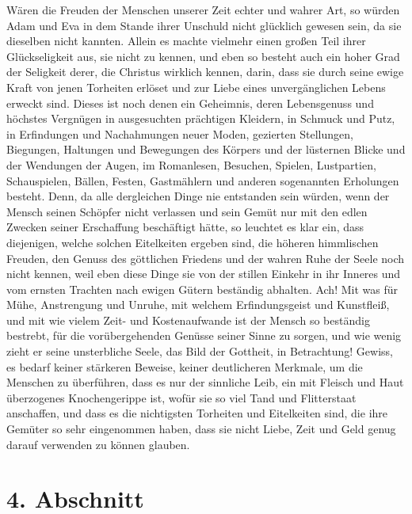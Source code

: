 Wären die Freuden der Menschen unserer Zeit echter und wahrer Art, so würden
Adam und Eva in dem Stande ihrer
Unschuld nicht glücklich gewesen sein, da sie
dieselben nicht kannten. Allein es machte vielmehr einen großen Teil ihrer
Glückseligkeit aus, sie nicht zu kennen, und eben so besteht auch ein hoher
Grad der Seligkeit derer, die Christus wirklich kennen, darin, dass sie durch
seine ewige Kraft von jenen Torheiten erlöset und zur Liebe eines
unvergänglichen Lebens erweckt sind. Dieses ist noch denen ein Geheimnis, deren
Lebensgenuss und höchstes Vergnügen in ausgesuchten prächtigen Kleidern, in
Schmuck und Putz, in Erfindungen und
Nachahmungen neuer Moden, gezierten
Stellungen, Biegungen, Haltungen und Bewegungen des Körpers und der lüsternen
Blicke und der Wendungen der Augen, im Romanlesen, Besuchen,
Spielen,
Lustpartien, Schauspielen, Bällen,
Festen, Gastmählern und anderen sogenannten
Erholungen besteht. Denn, da alle dergleichen Dinge nie entstanden sein würden,
wenn der Mensch seinen Schöpfer nicht verlassen und sein Gemüt nur mit den
edlen Zwecken seiner Erschaffung beschäftigt hätte, so leuchtet es klar ein,
dass
diejenigen, welche solchen Eitelkeiten ergeben sind, die höheren himmlischen
Freuden, den Genuss des göttlichen Friedens und der wahren Ruhe der Seele noch
nicht kennen, weil eben diese Dinge sie von der stillen Einkehr in ihr Inneres
und vom ernsten Trachten nach ewigen Gütern beständig abhalten. Ach! Mit was für
Mühe, Anstrengung und Unruhe, mit welchem Erfindungsgeist und Kunstfleiß, und
mit wie vielem Zeit- und Kostenaufwande ist der Mensch so beständig bestrebt,
für die vorübergehenden Genüsse seiner Sinne zu sorgen, und wie wenig zieht er
seine unsterbliche Seele, das Bild der Gottheit, in Betrachtung! Gewiss, es
bedarf keiner stärkeren Beweise, keiner deutlicheren Merkmale, um die Menschen
zu
überführen, dass es nur der sinnliche Leib, ein mit Fleisch und Haut überzogenes
Knochengerippe ist, wofür sie so viel Tand und
Flitterstaat anschaffen, und dass
es die nichtigsten Torheiten und Eitelkeiten sind, die ihre Gemüter so sehr
eingenommen haben, dass sie nicht Liebe, Zeit und Geld genug darauf
verwenden zu können glauben.

\section{4. Abschnitt} \label{kap17_ab4}

